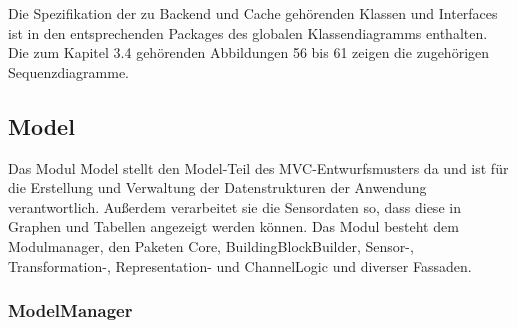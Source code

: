 \documentclass[parskip=full]{scrartcl}
\begin{document}
Die Spezifikation der zu Backend und Cache gehörenden Klassen und Interfaces ist in den entsprechenden Packages des globalen Klassendiagramms enthalten. Die zum Kapitel 3.4 gehörenden Abbildungen 56 bis 61 zeigen die zugehörigen Sequenzdiagramme.

\clearpage
\subsection{Model}

Das Modul Model stellt den Model-Teil des MVC-Entwurfsmusters da und ist für die Erstellung und Verwaltung der Datenstrukturen der Anwendung verantwortlich. Außerdem verarbeitet sie die Sensordaten so, dass diese in Graphen und Tabellen angezeigt werden können. Das Modul besteht dem Modulmanager, den Paketen Core, BuildingBlockBuilder, Sensor-, Transformation-, Representation- und ChannelLogic und diverser Fassaden.

\subsubsection{ModelManager}
\end{document}
